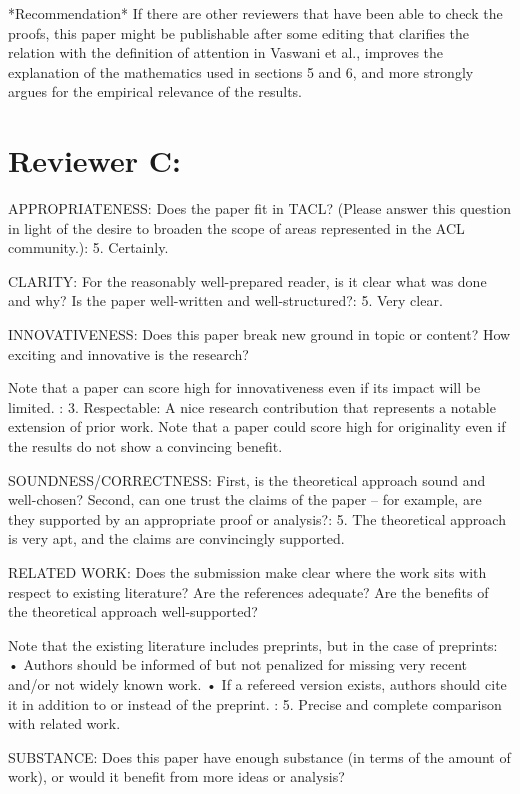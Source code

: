 \documentclass[11pt,a4paper]{article}
\begin{document}
*Recommendation*
If there are other reviewers that have been able to check the proofs, this
paper might be publishable after some editing that clarifies the relation
with the definition of attention in Vaswani et al., improves the explanation
of the mathematics used in sections 5 and 6, and more strongly argues for
the empirical relevance of the results.

\section{Reviewer C:}

APPROPRIATENESS: Does the paper fit in TACL? (Please answer this question in
light of the desire to broaden the scope of areas represented in the ACL
community.):
        5. Certainly.

CLARITY: For the reasonably well-prepared reader, is it clear what was done
and why? Is the paper well-written and well-structured?:
        5. Very clear.


INNOVATIVENESS: Does this paper break new ground in topic or content? How
exciting and innovative is the research?

Note that a paper can score high for innovativeness even if its impact will
be limited.
:
        3. Respectable: A nice research contribution that represents a notable
extension of prior work.
Note that a paper could score high for originality even if the results
do not show a convincing benefit.

SOUNDNESS/CORRECTNESS: First, is the theoretical approach sound and
well-chosen?  Second, can one trust the claims of the paper -- for example,
are they supported by an appropriate proof or analysis?:
        5. The theoretical approach is very apt, and the claims are convincingly
supported.


RELATED WORK: Does the submission make clear where the work sits with
respect to existing literature? Are the references adequate? Are the
benefits of the theoretical approach well-supported?

Note that the existing literature includes preprints, but in the case of
preprints:
• Authors should be informed of but not penalized for missing very recent
and/or not widely known work.
• If a refereed version exists, authors should cite it in addition to or
instead of the preprint.
:
        5. Precise and complete comparison with related work.


SUBSTANCE: Does this paper have enough substance (in terms of the amount of
work), or would it benefit from more ideas or analysis?
\end{document}
